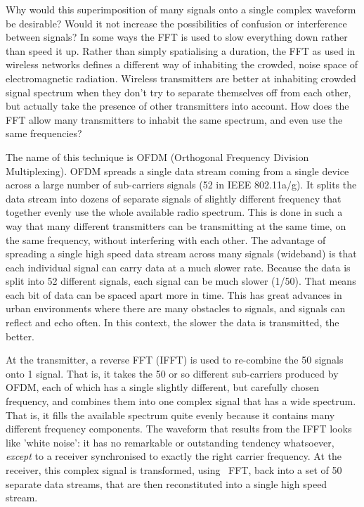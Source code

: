 Why would this superimposition of many signals onto a single complex
waveform be desirable? Would it not increase the possibilities of
confusion or interference between signals? In some ways the FFT is used
to slow everything down rather than speed it up. Rather than simply
spatialising a duration, the FFT as used in wireless networks defines a
different way of inhabiting the crowded, noise space of electromagnetic
radiation. Wireless transmitters are better at inhabiting crowded
signal spectrum when they don't try to separate
themselves off from each other, but actually take the presence of other
transmitters into account. How does the FFT allow many transmitters to
inhabit the same spectrum, and even use the same frequencies?

The name of this technique is OFDM (Orthogonal Frequency Division
Multiplexing). OFDM spreads a single data stream coming from a single
device across a large number of sub{}-carriers signals (52 in IEEE
802.11a/g). It splits the data stream into dozens of separate signals
of slightly different frequency that together evenly use the whole
available radio spectrum. This is done in such a way that many
different transmitters can be transmitting at the same time, on the
same frequency, without interfering with each other. The advantage of
spreading a single high speed data stream across many signals
({\quote wideband}) is that each individual
signal can carry data at a much slower rate. Because the data is split
into 52 different signals, each signal can be much slower (1/50). That
means each bit of data can be spaced apart more in time. This has great
advances in urban environments where there are many obstacles to
signals, and signals can reflect and echo often. In this context, the
slower the data is transmitted, the better.

At the transmitter, a reverse FFT (IFFT) is used to re{}-combine the 50
signals onto 1 signal. That is, it takes the 50 or so different
sub{}-carriers produced by OFDM, each of which has a single slightly
different, but carefully chosen frequency, and combines them into one
complex signal that has a wide spectrum. That is, it fills the
available spectrum quite evenly because it contains many different
frequency components. The waveform that results from the IFFT looks
like 'white noise': it has no
remarkable or outstanding tendency whatsoever, {\em except} to a receiver synchronised to exactly the right carrier frequency. At the receiver, this complex signal is transformed, using \ FFT, back
into a set of 50 separate data streams, that are then reconstituted
into a single high speed stream. 

